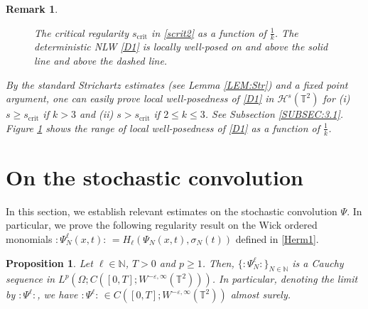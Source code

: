 \documentclass[letterpaper, 11pt,  reqno]{amsart}
\newtheorem{proposition}[theorem]{Proposition}
\newtheorem{remark}[theorem]{Remark}
\newcommand{\1}{\hspace{0.5mm}\text{I}\hspace{0.5mm}}
\newcommand{\T}{\mathbb{T}}
\newcommand{\eps}{\varepsilon}
\renewcommand{\l}{\ell}
\newcommand{\N}{\mathbb{N}}
\renewcommand{\H}{\mathcal{H}}
\numberwithin{equation}{section}
\numberwithin{theorem}{section}
\begin{document}
\begin{remark}
\begin{figure}
\begin{center}
\end{center} 





\caption{The critical regularity $s_{\text{crit}}$ in \eqref{scrit2} as a function of $\frac 1k$.
The deterministic NLW \eqref{D1} is locally well-posed on and above the solid line
and above the dashed line.}
 \label{FIG:1}

\end{figure}

By the standard Strichartz estimates (see Lemma \ref{LEM:Str})
and a fixed point argument, 
one can easily prove local well-posedness of \eqref{D1}
in $\H^{s} (\T^2)$
for  (i) $s \geq     s_\text{crit}$ if $k >3$ 
and (ii)  $s> s_\text{crit}$ if $ 2 \leq k \leq 3$.
See Subsection \ref{SUBSEC:3.1}.
Figure \ref{FIG:1} shows the range of local well-posedness
of \eqref{D1}
as a function of $\frac{1}{k}$.



\end{remark}
	


\section{On the stochastic convolution}
\label{SEC:2}

In this section, we establish relevant estimates on 
the stochastic convolution $\Psi$.
In particular, we prove 
the following regularity result  on the Wick ordered monomials 
$:\!\Psi^\l_N(x, t) \!: \, = H_\ell(\Psi_N(x, t),\sigma_N(t))$
defined in \eqref{Herm1}.




\begin{proposition}\label{PROP:sconv}
Let  $\l \in \N$, $T >0$ and $p\ge 1$. 
Then, $\{ :\!\Psi^\l_N \!:  \}_{N \in \mathbb{N}}$ 
is a Cauchy sequence in $L^p(\Omega; C([0,T];W^{-\eps,\infty}(\T^2)))$.
In particular, denoting the limit by  $:\!\Psi^\l\!:$,    
we have  $:\!\Psi^\l\!:\, \in C([0,T];W^{-\eps,\infty}(\T^2))$ almost surely.
\end{proposition}
\end{document}
